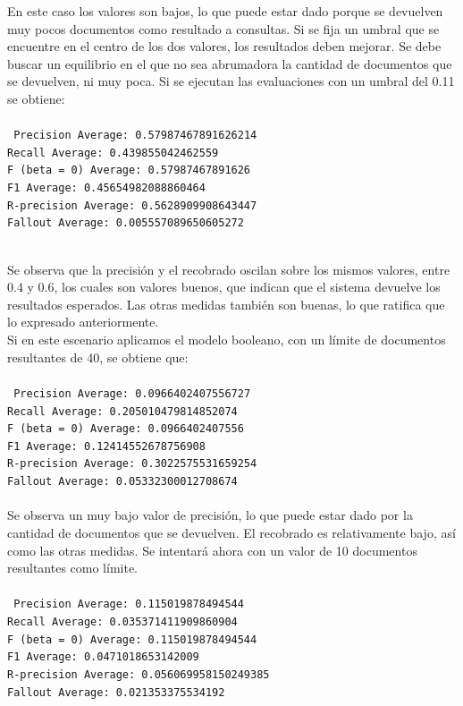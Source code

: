 \documentclass[twoside]{article}
\begin{document}
En este caso los valores son bajos, lo que puede estar dado porque se devuelven muy pocos documentos como resultado a consultas. Si se fija un umbral que se encuentre en el centro de los dos valores, los resultados deben mejorar. Se debe buscar un equilibrio en el que no sea abrumadora la cantidad de documentos que se devuelven, ni muy poca. Si se ejecutan las evaluaciones con un umbral del 0.11 se obtiene:\\\\
\texttt{
Precision Average: 0.57987467891626214 \\
Recall Average: 0.439855042462559 \\
F (beta = 0) Average: 0.57987467891626 \\
F1 Average: 0.45654982088860464 \\
R-precision Average: 0.5628909908643447 \\
Fallout Average: 0.005557089650605272 \\\\
}

Se observa que la precisi\'on y el recobrado oscilan sobre los mismos valores, entre 0.4 y 0.6, los cuales son valores buenos, que indican que el sistema devuelve los resultados esperados. Las otras medidas tambi\'en son buenas, lo que ratifica que lo expresado anteriormente.\\

Si en este escenario aplicamos el modelo booleano, con un l\'imite de documentos resultantes de 40, se obtiene que:\\\\
\texttt{
Precision Average: 0.0966402407556727 \\
Recall Average: 0.205010479814852074 \\
F (beta = 0) Average: 0.0966402407556 \\
F1 Average: 0.12414552678756908 \\
R-precision Average: 0.3022575531659254 \\
Fallout Average: 0.05332300012708674 \\\\
}
Se observa un muy bajo valor de precisi\'on, lo que puede estar dado por la cantidad de documentos que se devuelven. El recobrado es relativamente bajo, as\'i como las otras medidas. Se intentar\'a ahora con un valor de 10 documentos resultantes como l\'imite.\\\\
\texttt{
Precision Average: 0.115019878494544 \\
Recall Average: 0.035371411909860904 \\
F (beta = 0) Average: 0.115019878494544 \\
F1 Average: 0.0471018653142009 \\
R-precision Average: 0.056069958150249385 \\
Fallout Average: 0.021353375534192 \\\\
}
\end{document}
